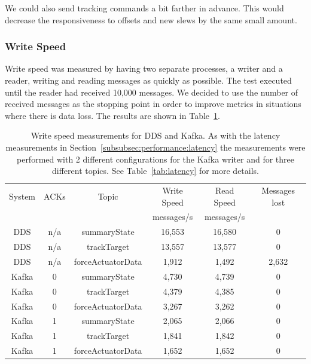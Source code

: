 \documentclass[]{spie}  %
\begin{document}
We could also send tracking commands a bit farther in advance.
This would decrease the responsiveness to offsets and new slews by the same small amount.

\subsubsection{Write Speed}
\label{subsubsec:performance:speed}

Write speed was measured by having two separate processes, a writer and a reader, writing and reading messages as quickly as possible.
The test executed until the reader had received 10,000 messages.
We decided to use the number of received messages as the stopping point in order to improve metrics in situations where there is data loss.
The results are shown in Table~\ref{tab:speed}.

\begin{table}[h]
    \centering
    \begin{tabular}{|c|c|c|c|c|c|}
        \hline
        System & ACKs & Topic             & Write Speed & Read Speed & Messages lost \\
               &      &                   & messages/s  & messages/s &               \\
        \hline
        DDS    & n/a  & summaryState      & 16,553      & 16,580     & 0             \\
        DDS    & n/a  & trackTarget       & 13,557      & 13,577     & 0             \\
        DDS    & n/a  & forceActuatorData &  1,912      &  1,492     & 2,632         \\
        Kafka  & 0    & summaryState      &  4,730      &  4,739     & 0             \\
        Kafka  & 0    & trackTarget       &  4,379      &  4,385     & 0             \\
        Kafka  & 0    & forceActuatorData &  3,267      &  3,262     & 0             \\
        Kafka  & 1    & summaryState      &  2,065      &  2,066     & 0             \\
        Kafka  & 1    & trackTarget       &  1,841      &  1,842     & 0             \\
        Kafka  & 1    & forceActuatorData &  1,652      &  1,652     & 0             \\
        \hline
    \end{tabular}
    \caption{
      Write speed measurements for DDS and Kafka.
      As with the latency measurements in Section~\ref{subsubsec:performance:latency} the measurements were performed with 2 different configurations for the Kafka writer and for three different topics.
      See Table~\ref{tab:latency} for more details.
    }
    \label{tab:speed}
\end{table}
\end{document}
